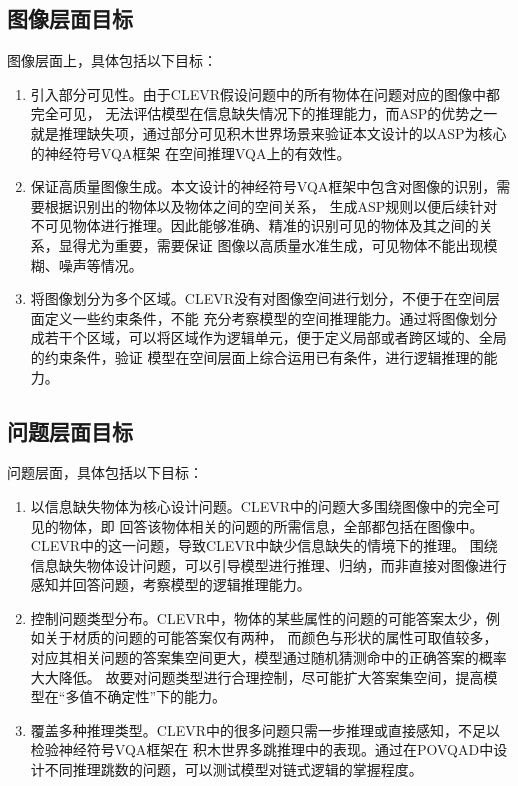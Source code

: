 \subsection{图像层面目标}
图像层面上，具体包括以下目标：
\begin{enumerate}[nosep]
\item 引入部分可见性。由于CLEVR假设问题中的所有物体在问题对应的图像中都完全可见，
无法评估模型在信息缺失情况下的推理能力，而ASP的优势之一就是推理缺失项\cite{fandinno2021planningincompleteinformationquantified}，通过部分可见积木世界场景来验证本文设计的以ASP为核心的神经符号VQA框架
在空间推理VQA上的有效性。
\item 保证高质量图像生成。本文设计的神经符号VQA框架中包含对图像的识别，需要根据识别出的物体以及物体之间的空间关系，
生成ASP规则以便后续针对不可见物体进行推理。因此能够准确、精准的识别可见的物体及其之间的关系，显得尤为重要，需要保证
图像以高质量水准生成，可见物体不能出现模糊、噪声等情况。
\item 将图像划分为多个区域。CLEVR没有对图像空间进行划分，不便于在空间层面定义一些约束条件，不能
充分考察模型的空间推理能力。通过将图像划分成若干个区域，可以将区域作为逻辑单元，便于定义局部或者跨区域的、全局的约束条件，验证
模型在空间层面上综合运用已有条件，进行逻辑推理的能力。
\end{enumerate}
\subsection{问题层面目标}
问题层面，具体包括以下目标：
\begin{enumerate}[nosep]
\item 以信息缺失物体为核心设计问题。CLEVR中的问题大多围绕图像中的完全可见的物体，即
回答该物体相关的问题的所需信息，全部都包括在图像中。CLEVR中的这一问题，导致CLEVR中缺少信息缺失的情境下的推理。
围绕信息缺失物体设计问题，可以引导模型进行推理、归纳，而非直接对图像进行感知并回答问题，考察模型的逻辑推理能力。
\item 控制问题类型分布。CLEVR中，物体的某些属性的问题的可能答案太少，例如关于材质的问题的可能答案仅有两种，
而颜色与形状的属性可取值较多，对应其相关问题的答案集空间更大，模型通过随机猜测命中的正确答案的概率大大降低。
故要对问题类型进行合理控制，尽可能扩大答案集空间，提高模型在“多值不确定性”下的能力。
\item 覆盖多种推理类型。CLEVR中的很多问题只需一步推理或直接感知，不足以检验神经符号VQA框架在
积木世界多跳推理中的表现。通过在POVQAD中设计不同推理跳数的问题，可以测试模型对链式逻辑的掌握程度。
\end{enumerate}
